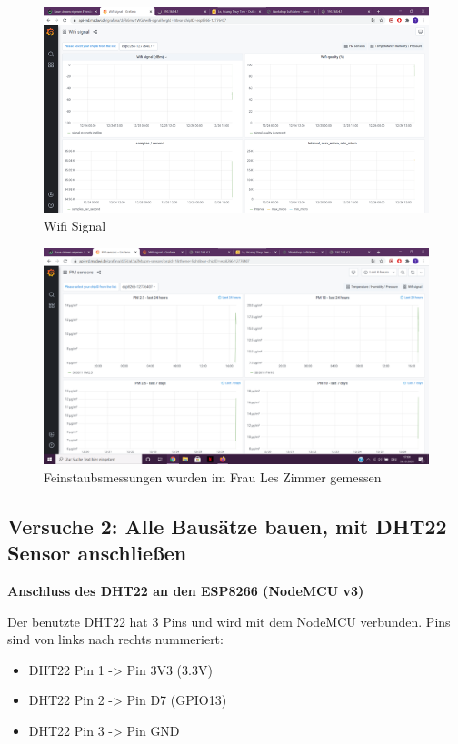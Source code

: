 \documentclass[draft=false
              ,paper=a4
              ,twoside=false
              ,fontsize=10pt
              ,headsepline
              ,BCOR10mm
              ,DIV11
              ]{article}
\begin{document}
\begin{figure}[H]
  \centering
  \includegraphics[width=0.8\linewidth]{versuch1_wlan}
  \caption{Wifi Signal}
\end{figure}

\begin{figure}[H]
  \centering
  \includegraphics[width=0.8\linewidth]{versuch1_pm}
  \caption{Feinstaubsmessungen wurden im Frau Les Zimmer gemessen}
\end{figure}

\subsection{Versuche 2: Alle Bausätze bauen, mit DHT22 Sensor anschließen}

\textbf{Anschluss des DHT22 an den ESP8266 (NodeMCU v3)}

Der benutzte DHT22 hat 3 Pins und wird mit dem NodeMCU verbunden. Pins sind von links nach rechts nummeriert:

\begin{itemize}
  \item DHT22 Pin 1 -> Pin 3V3 (3.3V) 
  \item DHT22 Pin 2 -> Pin D7 (GPIO13)
  \item DHT22 Pin 3 -> Pin GND
\end{itemize}

\vspace{2cm}
\end{document}

